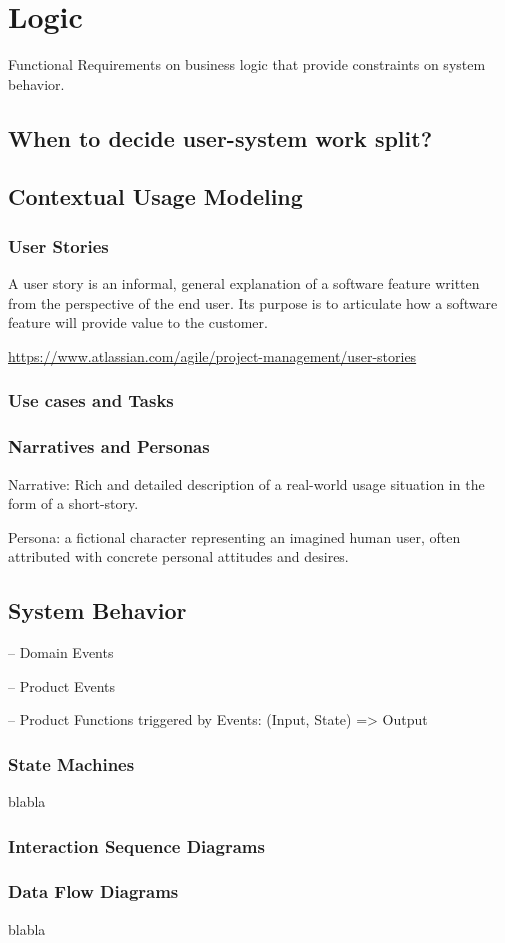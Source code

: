 
\chapter{Logic}%

Functional Requirements on business logic that provide constraints on system behavior.


\section{When to decide user-system work split?}

\section{Contextual Usage Modeling}%

\subsection{User Stories}

A user story is an informal, general explanation of a software feature written from the perspective of the end user. Its purpose is to articulate how a software feature will provide value to the customer.

\url{https://www.atlassian.com/agile/project-management/user-stories}

\subsection{Use cases and Tasks}

\subsection{Narratives and Personas}

Narrative: Rich and detailed description of a real-world usage situation in the form of a short-story.

Persona: a fictional character representing an imagined human user, often attributed with concrete personal attitudes and desires. 


\section{System Behavior}

-- Domain Events

-- Product Events

-- Product Functions triggered by Events: (Input, State) => Output

\subsection{State Machines}%
blabla 

\subsection{Interaction Sequence Diagrams}

\subsection{Data Flow Diagrams}%
blabla 


